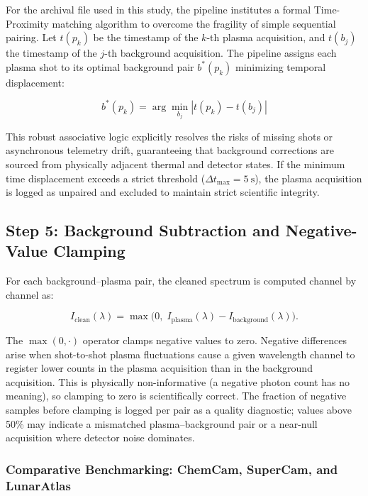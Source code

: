 \documentclass[a4paper,twocolumn,10pt]{article}
\begin{document}
For the archival file used in this study, the pipeline institutes a formal
Time-Proximity matching algorithm to overcome the fragility of simple sequential
pairing. Let $t(p_k)$ be the timestamp of the $k$-th plasma acquisition, and
$t(b_j)$ the timestamp of the $j$-th background acquisition. The pipeline
assigns each plasma shot to its optimal background pair $b^*(p_k)$ minimizing
temporal displacement:

\begin{equation}
\label{eq:proximity_pairing}
b^*(p_k) = \arg\min_{b_j} | t(p_k) - t(b_j) | 
\end{equation}

This robust associative logic explicitly resolves the risks of missing shots
or asynchronous telemetry drift, guaranteeing that background corrections
are sourced from physically adjacent thermal and detector states. If the 
minimum time displacement exceeds a strict threshold ($\Delta t_{\text{max}} = \SI{5}{\second}$), 
the plasma acquisition is logged as unpaired and excluded to maintain strict
scientific integrity.

\subsection{Step 5: Background Subtraction and Negative-Value Clamping}

For each background--plasma pair, the cleaned spectrum is computed
channel by channel as:

\begin{equation}
\label{eq:subtraction}
I_{\text{clean}}(\lambda) =
  \max\!\bigl(0,\;
  I_{\text{plasma}}(\lambda) - I_{\text{background}}(\lambda)
  \bigr).
\end{equation}

The $\max(0, \cdot)$ operator clamps negative values to zero.
Negative differences arise when shot-to-shot plasma fluctuations cause
a given wavelength channel to register lower counts in the plasma
acquisition than in the background acquisition.  This is physically
non-informative (a negative photon count has no meaning), so clamping
to zero is scientifically correct.  The fraction of negative samples
before clamping is logged per pair as a quality diagnostic; values
above 50\% may indicate a mismatched plasma--background pair or
a near-null acquisition where detector noise dominates.

\subsubsection{Comparative Benchmarking: ChemCam, SuperCam, and LunarAtlas}
\end{document}
